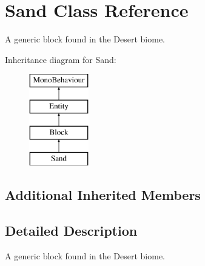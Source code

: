 \hypertarget{class_sand}{}\section{Sand Class Reference}
\label{class_sand}


A generic block found in the Desert biome.  


Inheritance diagram for Sand\+:\begin{figure}[H]
\begin{center}
\leavevmode
\includegraphics[height=4.000000cm]{class_sand}
\end{center}
\end{figure}
\subsection*{Additional Inherited Members}


\subsection{Detailed Description}
A generic block found in the Desert biome. 

